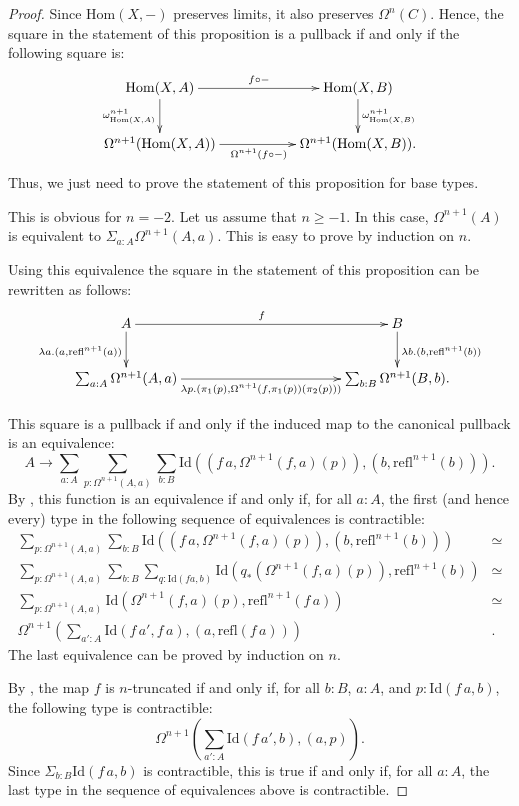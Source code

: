\documentclass[reqno]{amsart}
\theoremstyle{definition}
\theoremstyle{remark}
\newcommand{\fs}[1]{\mathrm{#1}}
\newcommand{\Hom}{\fs{Hom}}
\newcommand{\Id}{\fs{Id}}
\newcommand{\refl}{\fs{refl}}
\numberwithin{figure}{section}
\begin{document}
\begin{proof}
Since $\Hom(X,-)$ preserves limits, it also preserves $\Omega^n(C)$.
Hence, the square in the statement of this proposition is a pullback if and only if the following square is:
\[ \xymatrix{ \Hom(X,A) \ar[rr]^{f \circ -} \ar[d]_{\omega^{n+1}_{\Hom(X,A)}}   & & \Hom(X,B) \ar[d]^{\omega^{n+1}_{\Hom(X,B)}} \\
              \Omega^{n+1}(\Hom(X,A)) \ar[rr]_{\Omega^{n+1}(f \circ -)}         & & \Omega^{n+1}(\Hom(X,B)).
            } \]
Thus, we just need to prove the statement of this proposition for base types.

This is obvious for $n = -2$.
Let us assume that $n \geq -1$.
In this case, $\Omega^{n+1}(A)$ is equivalent to $\Sigma_{a : A} \Omega^{n+1}(A,a)$.
This is easy to prove by induction on $n$.

Using this equivalence the square in the statement of this proposition can be rewritten as follows:
\[ \xymatrix{ A \ar[rrrr]^f \ar[d]_{\lambda a.(a,\refl^{n+1}(a))}                                                   & & & & B \ar[d]^{\lambda b.(b,\refl^{n+1}(b))} \\
              \sum_{a : A} \Omega^{n+1}(A,a) \ar[rrrr]_-{\lambda p.(\pi_1(p),\Omega^{n+1}(f,\pi_1(p))(\pi_2(p)))}   & & & & \sum_{b : B} \Omega^{n+1}(B,b).
            } \]

This square is a pullback if and only if the induced map to the canonical pullback is an equivalence:
\[ A \to \sum_{a : A} \sum_{p : \Omega^{n+1}(A,a)} \sum_{b : B} \Id((f\,a,\Omega^{n+1}(f,a)(p)),(b,\refl^{n+1}(b))). \]
By \cite[Theorem~4.7.7]{hottbook}, this function is an equivalence if and only if, for all $a : A$, the first (and hence every) type in the following sequence of equivalences is contractible:
\begin{align*}
\sum_{p : \Omega^{n+1}(A,a)} \sum_{b : B} \Id((f\,a,\Omega^{n+1}(f,a)(p)),(b,\refl^{n+1}(b))) & \simeq \\
\sum_{p : \Omega^{n+1}(A,a)} \sum_{b : B} \sum_{q : \Id(f a,b)} \Id(q_*(\Omega^{n+1}(f,a)(p)),\refl^{n+1}(b)) & \simeq \\
\sum_{p : \Omega^{n+1}(A,a)} \Id(\Omega^{n+1}(f,a)(p),\refl^{n+1}(f\,a)) & \simeq \\
\Omega^{n+1}(\sum_{a' : A} \Id(f\,a',f\,a), (a,\refl(f\,a))) & .
\end{align*}
The last equivalence can be proved by induction on $n$.

By \cite[Theorem~7.2.9]{hottbook}, the map $f$ is $n$-truncated if and only if, for all $b : B$, $a : A$, and $p : \Id(f\,a,b)$, the following type is contractible:
\[ \Omega^{n+1}(\sum_{a' : A} \Id(f\,a',b), (a,p)). \]
Since $\Sigma_{b : B} \Id(f\,a,b)$ is contractible, this is true if and only if, for all $a : A$, the last type in the sequence of equivalences above is contractible.
\end{proof}
\end{document}
